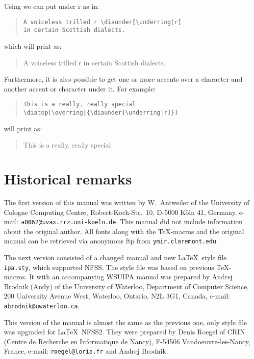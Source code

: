 Using  we can put \underring under r as in:
%
\begin{quote}\begin{verbatim}
A voiceless trilled r \diaunder[\underring|r]
in certain Scottish dialects.
\end{verbatim}\end{quote}
%
which will print as:
%
\begin{quote}
A voiceless trilled r \diaunder[\underring|r]
in certain Scottish dialects.
\end{quote}
%

Furthermore, it is also possible to get one or more accents over a
character and another accent or character under it. For example:
%
\begin{quote}\begin{verbatim}
This is a really, really special
\diatop[\overring|{\diaunder[\underring|r]}]
\end{verbatim}\end{quote}
%
will print as:
%
\begin{quote}
This is a really, really special
\diatop[\overring|{\diaunder[\underring|r]}]
\end{quote}

\section{Historical remarks}

The first version of this manual was written by W.\ Antweiler of the
University of Cologne Computing Centre, Robert-Koch-Str.\ 10, D-5000
K\"{o}ln 41, Germany, e-mail: {\tt a0062@uvax.rrz.uni-koeln.de}. This
manual did not include information about the original author. All
fonts along with the \TeX-macros and the original manual can be
retrieved via anonymous ftp from {\tt ymir.claremont.edu}.

The next version consisted of a changed manual and new \LaTeX\ style
file {\tt ipa.sty}, which supported NFSS. The style file was based on
previous \TeX-macros. It with an accompanying WSUIPA manual was
prepared by Andrej Brodnik (Andy) of the University of Waterloo,
Department of Computer Science, 200 University Avenue West, Waterloo,
Ontario, N2L 3G1, Canada, e-mail: {\tt abrodnik@uwaterloo.ca}.

This version of the manual is almost the same as the previous one,
only style file was upgraded for \LaTeX\ NFSS2. They were prepared by
Denis Roegel of CRIN (Centre de Recherche en Informatique de Nancy),
F-54506 Vandoeuvre-les-Nancy, France, e-mail: {\tt roegel@loria.fr}
and Andrej Brodnik.




